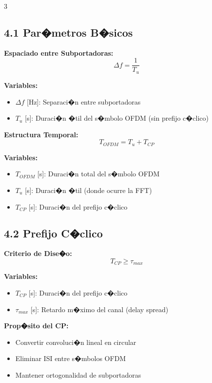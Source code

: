 ﻿\documentclass[8pt,a4paper]{article}
\begin{document}
\begin{multicols}{3}
\subsection*{\small 4.1 Par�metros B�sicos}
\vspace{-2mm}

\textbf{Espaciado entre Subportadoras:}
\[
\Delta f = \frac{1}{T_u}
\]

\textbf{Variables:}
\begin{itemize}[leftmargin=*,itemsep=0pt]
    \item $\Delta f$ [Hz]: Separaci�n entre subportadoras
    \item $T_u$ [s]: Duraci�n �til del s�mbolo OFDM (sin prefijo c�clico)
\end{itemize}

\textbf{Estructura Temporal:}
\[
T_{OFDM} = T_u + T_{CP}
\]

\textbf{Variables:}
\begin{itemize}[leftmargin=*,itemsep=0pt]
    \item $T_{OFDM}$ [s]: Duraci�n total del s�mbolo OFDM
    \item $T_u$ [s]: Duraci�n �til (donde ocurre la FFT)
    \item $T_{CP}$ [s]: Duraci�n del prefijo c�clico
\end{itemize}

\vspace{-2mm}
\subsection*{\small 4.2 Prefijo C�clico}
\vspace{-2mm}

\textbf{Criterio de Dise�o:}
\[
T_{CP} \geq \tau_{max}
\]

\textbf{Variables:}
\begin{itemize}[leftmargin=*,itemsep=0pt]
    \item $T_{CP}$ [s]: Duraci�n del prefijo c�clico
    \item $\tau_{max}$ [s]: Retardo m�ximo del canal (delay spread)
\end{itemize}

\textbf{Prop�sito del CP:}
\begin{itemize}[leftmargin=*,itemsep=0pt]
    \item Convertir convoluci�n lineal en circular
    \item Eliminar ISI entre s�mbolos OFDM
    \item Mantener ortogonalidad de subportadoras
\end{itemize}


\end{multicols}
\end{document}
